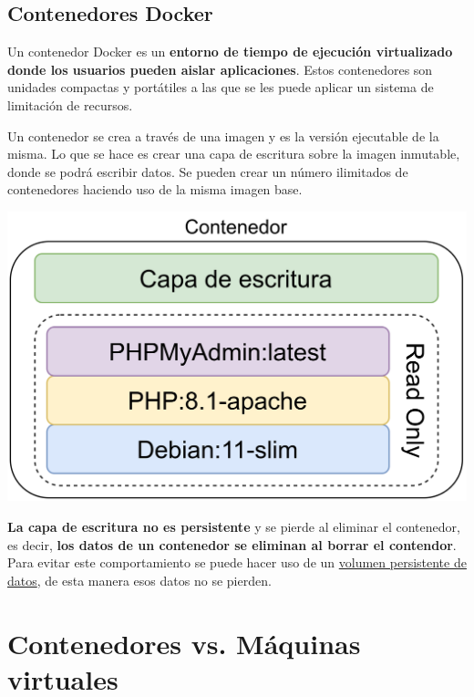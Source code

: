 \subsection{Contenedores Docker}
Un contenedor Docker es un \textbf{entorno de tiempo de ejecución virtualizado donde los usuarios pueden aislar aplicaciones}. Estos contenedores son unidades compactas y portátiles a las que se les puede aplicar un sistema de limitación de recursos.


Un contenedor se crea a través de una imagen y es la versión ejecutable de la misma. Lo que se hace es crear una capa de escritura sobre la imagen inmutable, donde se podrá escribir datos. Se pueden crear un número ilimitados de contenedores haciendo uso de la misma imagen base.

\vspace{-15pt}
\begin{center}
    \includegraphics[width=0.6\linewidth]{img/docker/contenedor.png}
\end{center}
\vspace{-15pt}

\textbf{La capa de escritura no es persistente} y se pierde al eliminar el contenedor, es decir, \textbf{los datos de un contenedor se eliminan al borrar el contendor}. Para evitar este comportamiento se puede hacer uso de un \hyperlink{volumen_persistente_datos}{volumen persistente de datos}, de esta manera esos datos no se pierden.



\section{Contenedores vs. Máquinas virtuales}

